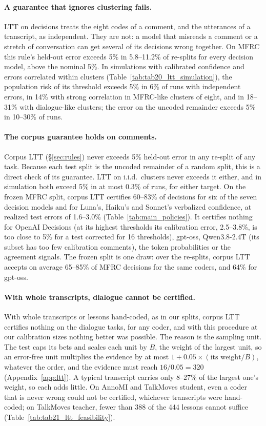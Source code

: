\paragraph{A guarantee that ignores clustering fails.} LTT on decisions treats the eight codes of a comment, and the
utterances of a transcript, as independent. They are not: a model that misreads a comment or a stretch of conversation
can get several of its decisions wrong together. On MFRC this rule's held-out error exceeds 5\% in 5.8--11.2\% of
re-splits for every decision model, above the nominal 5\%. In simulations with calibrated confidence and errors correlated
within clusters (Table~\ref{tab:tab20_ltt_simulation}), the population risk of its threshold exceeds 5\% in 6\% of runs with
independent errors, in 14\% with strong correlation in MFRC-like clusters of eight, and in 18--31\% with dialogue-like
clusters; the error on the uncoded remainder exceeds 5\% in 10--30\% of runs.

\paragraph{The corpus guarantee holds on comments.} Corpus LTT (\S\ref{sec:rules}) never exceeds 5\% held-out error in any
re-split of any task. Because each test split is the uncoded remainder of a random split, this is a direct check of its
guarantee. LTT on i.i.d.\ clusters never exceeds it either, and in simulation both exceed 5\% in at most 0.3\% of runs, for
either target. On the frozen MFRC split, corpus LTT certifies 60--83\% of decisions for six of the seven decision models and
for Luna's, Haiku's and Sonnet's verbalized confidence, at realized test errors of 1.6--3.0\% (Table~\ref{tab:main_policies}).
It certifies nothing for OpenAI Decisions (at its highest thresholds its calibration error, 2.5--3.8\%, is too close to 5\% for
a test corrected for 16 thresholds), gpt-oss, Qwen3.8-2.4T (its subset has too few calibration comments), the token
probabilities or the agreement signals. The frozen split is one draw: over the re-splits, corpus LTT accepts on average
65--85\% of MFRC decisions for the same coders, and 64\% for gpt-oss.

\paragraph{With whole transcripts, dialogue cannot be certified.} With whole transcripts or lessons hand-coded, as in our
splits, corpus LTT certifies nothing on the dialogue tasks, for any coder, and with this procedure at our calibration sizes
nothing better was possible. The reason is the sampling unit. The test caps its bets and scales each unit by $B$, the weight
of the largest unit, so an error-free unit multiplies the evidence by at most $1+0.05\times(\text{its weight}/B)$, whatever
the order, and the evidence must reach $16/0.05=320$ (Appendix~\ref{app:ltt}). A typical transcript carries only 8--27\% of the
largest one's weight, so each adds little. On AnnoMI and TalkMoves student, even a coder that is never wrong could not be
certified, whichever transcripts were hand-coded; on TalkMoves teacher, fewer than 388 of the 444 lessons cannot suffice
(Table~\ref{tab:tab21_ltt_feasibility}).

